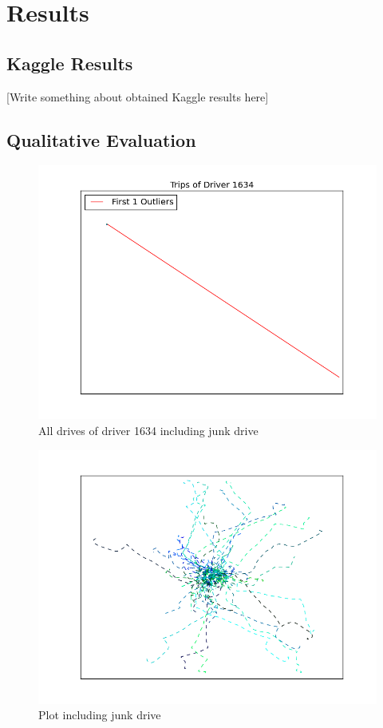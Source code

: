 \documentclass{vldb}
\begin{document}
\section{Results}
\label{sec:Results}
\subsection{Kaggle Results}
[Write something about obtained Kaggle results here]

\subsection{Qualitative Evaluation}
\begin{figure}
\centering
\includegraphics[width=\linewidth]{"pics/outliers_junk/1634_with_136"}
\caption{All drives of driver 1634 including junk drive}
\label{fig:junk-drive}
\end{figure}

\begin{figure}
\centering
\includegraphics[width=\linewidth]{"pics/outliers_junk/D_1634_wo_136"}
\caption{Plot including junk drive}
\label{fig:junk-drive}
\end{figure}
\end{document}
